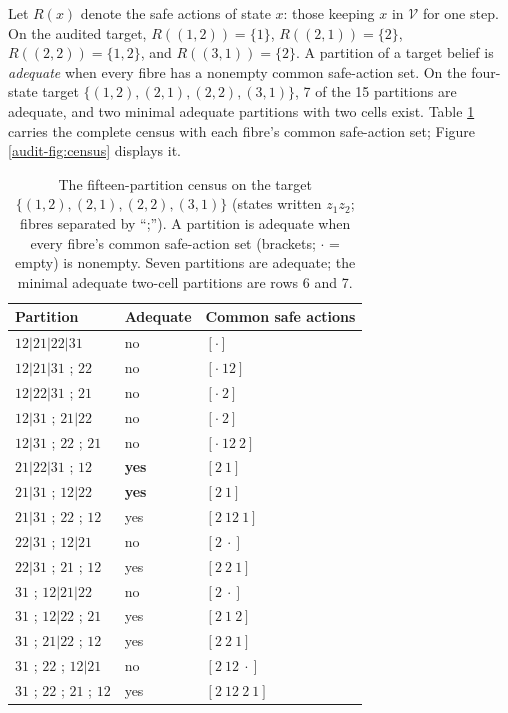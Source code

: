 \documentclass[10pt,twocolumn]{article}
\theoremstyle{plain}
\theoremstyle{definition}
\theoremstyle{remark}
\begin{document}
Let \(R(x)\) denote the safe actions of state \(x\): those keeping
\(x\) in \(\mathcal{V}\) for one step. On the audited target,
\(R((1,2)) = \{1\}\), \(R((2,1)) = \{2\}\), \(R((2,2)) = \{1,2\}\), and
\(R((3,1)) = \{2\}\). A partition of a target belief is \emph{adequate}
when every fibre has a nonempty common safe-action set. On the
four-state target \(\{(1,2), (2,1), (2,2), (3,1)\}\), 7 of the 15
partitions are adequate, and two minimal adequate partitions with two
cells exist. Table \ref{audit-tab:census} carries the complete census with
each fibre's common safe-action set; Figure \ref{audit-fig:census} displays
it.

\begin{table}[t]
\centering
\footnotesize
\caption{The fifteen-partition census on the target
\(\{(1,2), (2,1), (2,2), (3,1)\}\) (states written \(z_1 z_2\); fibres
separated by ``;''). A partition is adequate when every fibre's common
safe-action set (brackets; \(\cdot\) = empty) is nonempty. Seven
partitions are adequate; the minimal adequate two-cell partitions are
rows 6 and 7.}
\label{audit-tab:census}
\begin{tabular}{@{}l l l@{}}
\toprule
Partition & Adequate & Common safe actions\\
\midrule
$12|21|22|31$ & no & $[\cdot]$\\
$12|21|31$ ; $22$ & no & $[\cdot\ 12]$\\
$12|22|31$ ; $21$ & no & $[\cdot\ 2]$\\
$12|31$ ; $21|22$ & no & $[\cdot\ 2]$\\
$12|31$ ; $22$ ; $21$ & no & $[\cdot\ 12\ 2]$\\
$21|22|31$ ; $12$ & \textbf{yes} & $[2\ 1]$\\
$21|31$ ; $12|22$ & \textbf{yes} & $[2\ 1]$\\
$21|31$ ; $22$ ; $12$ & yes & $[2\ 12\ 1]$\\
$22|31$ ; $12|21$ & no & $[2\ \cdot]$\\
$22|31$ ; $21$ ; $12$ & yes & $[2\ 2\ 1]$\\
$31$ ; $12|21|22$ & no & $[2\ \cdot]$\\
$31$ ; $12|22$ ; $21$ & yes & $[2\ 1\ 2]$\\
$31$ ; $21|22$ ; $12$ & yes & $[2\ 2\ 1]$\\
$31$ ; $22$ ; $12|21$ & no & $[2\ 12\ \cdot]$\\
$31$ ; $22$ ; $21$ ; $12$ & yes & $[2\ 12\ 2\ 1]$\\
\bottomrule
\end{tabular}
\end{table}
\end{document}
